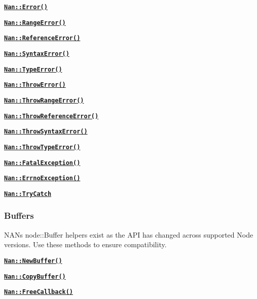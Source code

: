 \begin{DoxyItemize}
\item \href{doc/errors.md#api_nan_error}{\tt {\bfseries {\ttfamily Nan\+::\+Error()}}}
\item \href{doc/errors.md#api_nan_range_error}{\tt {\bfseries {\ttfamily Nan\+::\+Range\+Error()}}}
\item \href{doc/errors.md#api_nan_reference_error}{\tt {\bfseries {\ttfamily Nan\+::\+Reference\+Error()}}}
\item \href{doc/errors.md#api_nan_syntax_error}{\tt {\bfseries {\ttfamily Nan\+::\+Syntax\+Error()}}}
\item \href{doc/errors.md#api_nan_type_error}{\tt {\bfseries {\ttfamily Nan\+::\+Type\+Error()}}}
\item \href{doc/errors.md#api_nan_throw_error}{\tt {\bfseries {\ttfamily Nan\+::\+Throw\+Error()}}}
\item \href{doc/errors.md#api_nan_throw_range_error}{\tt {\bfseries {\ttfamily Nan\+::\+Throw\+Range\+Error()}}}
\item \href{doc/errors.md#api_nan_throw_reference_error}{\tt {\bfseries {\ttfamily Nan\+::\+Throw\+Reference\+Error()}}}
\item \href{doc/errors.md#api_nan_throw_syntax_error}{\tt {\bfseries {\ttfamily Nan\+::\+Throw\+Syntax\+Error()}}}
\item \href{doc/errors.md#api_nan_throw_type_error}{\tt {\bfseries {\ttfamily Nan\+::\+Throw\+Type\+Error()}}}
\item \href{doc/errors.md#api_nan_fatal_exception}{\tt {\bfseries {\ttfamily Nan\+::\+Fatal\+Exception()}}}
\item \href{doc/errors.md#api_nan_errno_exception}{\tt {\bfseries {\ttfamily Nan\+::\+Errno\+Exception()}}}
\item \href{doc/errors.md#api_nan_try_catch}{\tt {\bfseries {\ttfamily Nan\+::\+Try\+Catch}}}
\end{DoxyItemize}

\subsubsection*{Buffers}

N\+AN\textquotesingle{}s {\ttfamily node\+::\+Buffer} helpers exist as the A\+PI has changed across supported Node versions. Use these methods to ensure compatibility.


\begin{DoxyItemize}
\item \href{doc/buffers.md#api_nan_new_buffer}{\tt {\bfseries {\ttfamily Nan\+::\+New\+Buffer()}}}
\item \href{doc/buffers.md#api_nan_copy_buffer}{\tt {\bfseries {\ttfamily Nan\+::\+Copy\+Buffer()}}}
\item \href{doc/buffers.md#api_nan_free_callback}{\tt {\bfseries {\ttfamily Nan\+::\+Free\+Callback()}}}
\end{DoxyItemize}

